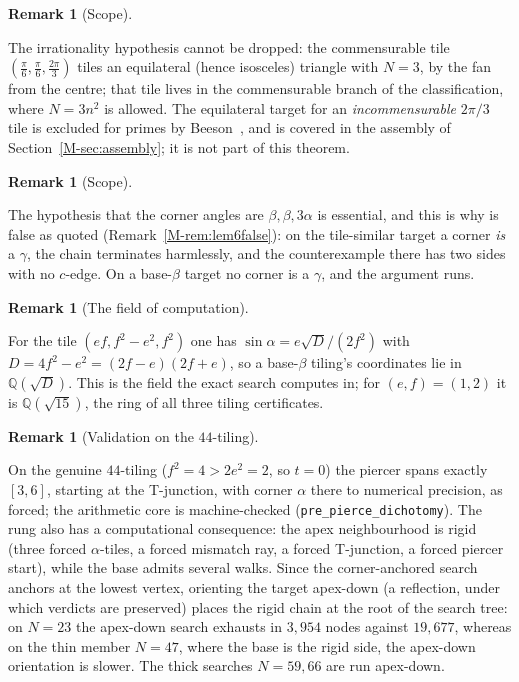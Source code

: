 \documentclass[11pt,reqno]{amsart}
\theoremstyle{plain}
\theoremstyle{definition}
\newtheorem{remark}[theorem]{Remark}
\newcommand{\Q}{\mathbb{Q}}
\begin{document}
\begin{remark}[Scope]\label{OM-incomm}

The irrationality hypothesis cannot be dropped: the commensurable tile
$(\frac\pi6,\frac\pi6,\frac{2\pi}3)$ tiles an equilateral (hence isosceles) triangle with $N=3$, by
the fan from the centre; that tile lives in the commensurable branch of the classification, where
$N=3n^2$ is allowed. The equilateral target for an \emph{incommensurable} $2\pi/3$ tile is excluded
for primes by Beeson~\cite{BeesonEq}, and is covered in the assembly of Section~\ref{M-sec:assembly};
it is not part of this theorem.
\end{remark}

\begin{remark}[Scope]\label{OM-gammascope}

The hypothesis that the corner angles are $\beta,\beta,3\alpha$ is essential, and this is why
\cite[Lem.~6]{BeesonIII} is false as quoted (Remark~\ref{M-rem:lem6false}): on the tile-similar target
a corner \emph{is} a $\gamma$, the chain terminates harmlessly, and the counterexample there has two
sides with no $c$-edge. On a base-$\beta$ target no corner is a $\gamma$, and the argument runs.
\end{remark}

\begin{remark}[The field of computation]\label{OM-fieldshort}

For the tile $(ef,f^2-e^2,f^2)$ one has $\sin\alpha=e\sqrt D/(2f^2)$ with $D=4f^2-e^2=(2f-e)(2f+e)$,
so a base-$\beta$ tiling's coordinates lie in $\Q(\sqrt D)$. This is the field the exact search
computes in; for $(e,f)=(1,2)$ it is $\Q(\sqrt{15})$, the ring of all three tiling certificates.
\end{remark}

\begin{remark}[Validation on the $44$-tiling]\label{OM-rung2}

On the genuine $44$-tiling ($f^2=4>2e^2=2$, so $t=0$) the piercer spans exactly $[3,6]$, starting at
the T-junction, with corner $\alpha$ there to numerical precision, as forced; the arithmetic core is
machine-checked (\texttt{pre\_pierce\_dichotomy}). The rung also has a computational consequence: the
apex neighbourhood is rigid (three forced $\alpha$-tiles, a forced mismatch ray, a forced T-junction,
a forced piercer start), while the base admits several walks. Since the corner-anchored search
anchors at the lowest vertex, orienting the target apex-down (a reflection, under which verdicts are
preserved) places the rigid chain at the root of the search tree: on $N=23$ the apex-down search
exhausts in $3{,}954$ nodes against $19{,}677$, whereas on the thin member $N=47$, where the base is
the rigid side, the apex-down orientation is slower. The thick searches $N=59,66$ are run apex-down.
\end{remark}
\end{document}
